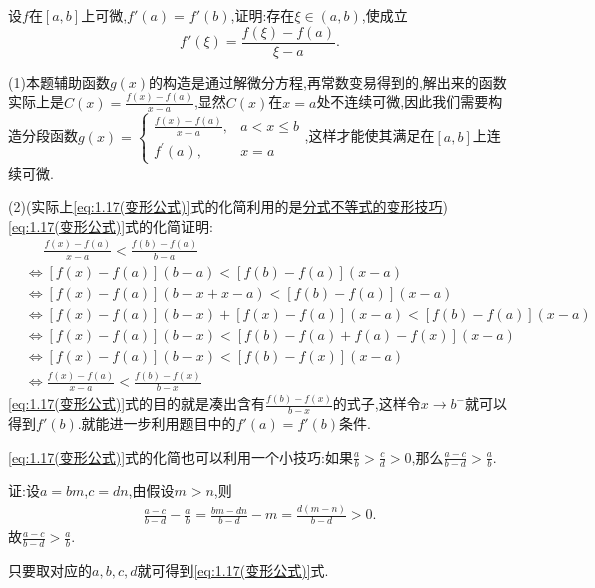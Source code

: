 \documentclass[lang=cn,newtx,10pt,scheme=chinese]{../Template/elegantbook}
\begin{document}
\begin{exercise}
    设\(f\)在\([a,b]\)上可微,\(f'(a) = f'(b)\),证明:存在\(\xi\in(a,b)\),使成立
    \[
    f'(\xi) = \frac{f(\xi) - f(a)}{\xi - a}.
    \]
\end{exercise}
\begin{note}
(1)本题辅助函数$g(x)$的构造是通过解微分方程,再常数变易得到的,解出来的函数实际上是$C(x)=\frac{f(x) - f(a)}{x - a}$,显然$C(x)$在$x=a$处不连续可微,因此我们需要构造分段函数$g(x) = \begin{cases}
    \frac{f(x) - f(a)}{x - a}, & a < x \leq b\\
    f^{\prime}(a), & x = a
\end{cases}$,这样才能使其满足在$[a,b]$上连续可微.

(2)(实际上\eqref{eq:1.17(变形公式)}式的化简利用的是\hyperref[pro:分式不等式等价变形]{分式不等式的变形技巧})
\eqref{eq:1.17(变形公式)}式的\hypertarget{1.17式的化简证明}{化简证明}:
\begin{align*}
    &\,\,\,\,\,\,\,\,\frac{f(x)-f(a)}{x-a}<\frac{f(b)-f(a)}{b-a}
\\
&\Leftrightarrow \left[ f\left( x \right) -f\left( a \right) \right] \left( b-a \right) <\left[ f\left( b \right) -f\left( a \right) \right] \left( x-a \right) 
\\
&\Leftrightarrow \left[ f\left( x \right) -f\left( a \right) \right] \left( b-x+x-a \right) <\left[ f\left( b \right) -f\left( a \right) \right] \left( x-a \right) 
\\
&\Leftrightarrow \left[ f\left( x \right) -f\left( a \right) \right] \left( b-x \right) +\left[ f\left( x \right) -f\left( a \right) \right] \left( x-a \right) <\left[ f\left( b \right) -f\left( a \right) \right] \left( x-a \right) 
\\
&\Leftrightarrow \left[ f\left( x \right) -f\left( a \right) \right] \left( b-x \right) <\left[ f\left( b \right) -f\left( a \right) +f\left( a \right) -f\left( x \right) \right] \left( x-a \right) 
\\
&\Leftrightarrow \left[ f\left( x \right) -f\left( a \right) \right] \left( b-x \right) <\left[ f\left( b \right) -f\left( x \right) \right] \left( x-a \right) 
\\
&\Leftrightarrow \frac{f(x)-f(a)}{x-a}<\frac{f(b)-f(x)}{b-x}
\end{align*}
\eqref{eq:1.17(变形公式)}式的目的就是凑出含有$\frac{f(b)-f(x)}{b-x}$的式子,这样令$x\to b^-$就可以得到$f'(b)$.就能进一步利用题目中的$f'(a)=f'(b)$条件.
\end{note}
\begin{remark}
    \eqref{eq:1.17(变形公式)}式的化简也可以利用一个小技巧:如果\(\frac{a}{b}>\frac{c}{d}>0\),那么\(\frac{a - c}{b - d}>\frac{a}{b}\).

    证:设\(a = bm\),\(c = dn\),由假设\(m>n\),则
    \begin{align*}
        \frac{a - c}{b - d} - \frac{a}{b} = \frac{bm - dn}{b - d} - m = \frac{d(m - n)}{b - d}>0.
    \end{align*}
    故\(\frac{a - c}{b - d}>\frac{a}{b}\).
    
    只要取对应的\(a,b,c,d\)就可得到\eqref{eq:1.17(变形公式)}式.
\end{remark}
\end{document}
